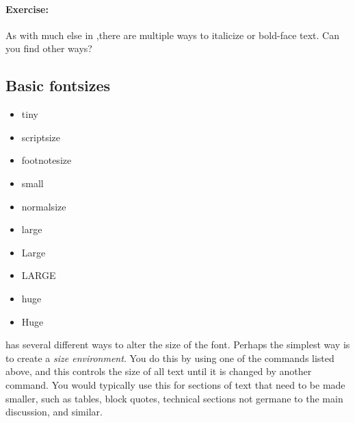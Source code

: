         \paragraph{Exercise:}As with much else in \Lx,there are multiple ways to italicize or bold-face text. Can you find other ways?



        \subsection{Basic fontsizes}
        \label{Basic fontsizes}
        
        \begin{cmd}
            \begin{itemize}
                \item{tiny}
                \item{scriptsize}
                \item{footnotesize}
                \item{small}
                \item{normalsize}
                \item{large}
                \item{Large}
                \item{LARGE}
                \item{huge}
                \item{Huge}
            \end{itemize}
        \end{cmd}

\Lx{} has several different ways to alter the size of the font. Perhaps the simplest way is to create a \textit{size environment}. You do this by using one of the commands listed above, and this controls the size of all text until it is changed by another command. You would typically use this for sections of text that need to be made smaller, such as tables, block quotes, technical sections not germane to the main discussion, and similar.

